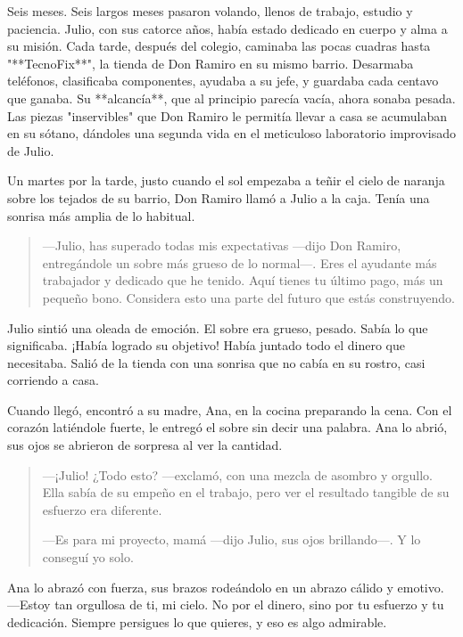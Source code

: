 \documentclass[a4paper,12pt]{book}
\begin{document}
Seis meses. Seis largos meses pasaron volando, llenos de trabajo, estudio y paciencia. Julio, con sus catorce años, había estado dedicado en cuerpo y alma a su misión. Cada tarde, después del colegio, caminaba las pocas cuadras hasta "**TecnoFix**", la tienda de Don Ramiro en su mismo barrio. Desarmaba teléfonos, clasificaba componentes, ayudaba a su jefe, y guardaba cada centavo que ganaba. Su **alcancía**, que al principio parecía vacía, ahora sonaba pesada. Las piezas "inservibles" que Don Ramiro le permitía llevar a casa se acumulaban en su sótano, dándoles una segunda vida en el meticuloso laboratorio improvisado de Julio.

Un martes por la tarde, justo cuando el sol empezaba a teñir el cielo de naranja sobre los tejados de su barrio, Don Ramiro llamó a Julio a la caja. Tenía una sonrisa más amplia de lo habitual.

\begin{quote}
    —Julio, has superado todas mis expectativas —dijo Don Ramiro, entregándole un sobre más grueso de lo normal—. Eres el ayudante más trabajador y dedicado que he tenido. Aquí tienes tu último pago, más un pequeño bono. Considera esto una parte del futuro que estás construyendo.
\end{quote}

Julio sintió una oleada de emoción. El sobre era grueso, pesado. Sabía lo que significaba. ¡Había logrado su objetivo! Había juntado todo el dinero que necesitaba. Salió de la tienda con una sonrisa que no cabía en su rostro, casi corriendo a casa.

Cuando llegó, encontró a su madre, Ana, en la cocina preparando la cena. Con el corazón latiéndole fuerte, le entregó el sobre sin decir una palabra. Ana lo abrió, sus ojos se abrieron de sorpresa al ver la cantidad.

\begin{quote}
    —¡Julio! ¿Todo esto? —exclamó, con una mezcla de asombro y orgullo. Ella sabía de su empeño en el trabajo, pero ver el resultado tangible de su esfuerzo era diferente.

    —Es para mi proyecto, mamá —dijo Julio, sus ojos brillando—. Y lo conseguí yo solo.
\end{quote}

Ana lo abrazó con fuerza, sus brazos rodeándolo en un abrazo cálido y emotivo. —Estoy tan orgullosa de ti, mi cielo. No por el dinero, sino por tu esfuerzo y tu dedicación. Siempre persigues lo que quieres, y eso es algo admirable.
\end{document}

